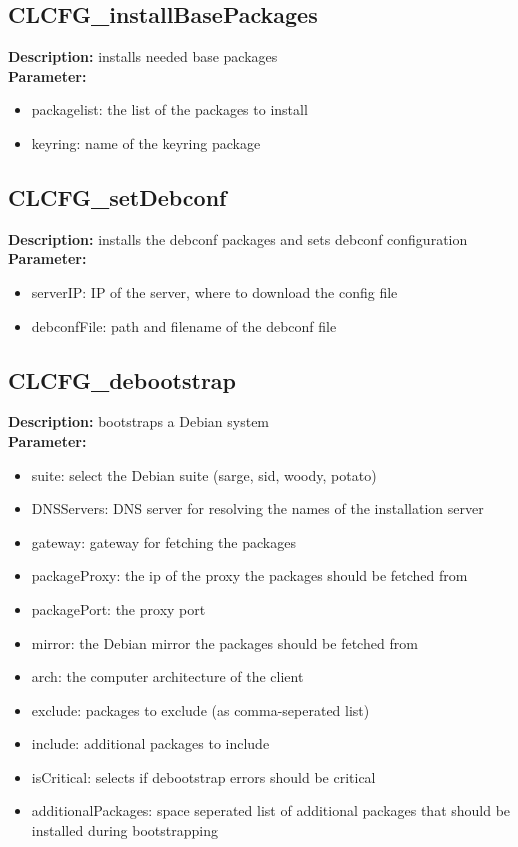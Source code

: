\subsection{CLCFG\_installBasePackages}
\textbf{Description:} installs needed base packages\\
\textbf{Parameter:}
\begin{itemize}
\item packagelist: the list of the packages to install
\item keyring: name of the keyring package
\end{itemize}

\subsection{CLCFG\_setDebconf}
\textbf{Description:} installs the debconf packages and sets debconf configuration\\
\textbf{Parameter:}
\begin{itemize}
\item serverIP: IP of the server, where to download the config file
\item debconfFile: path and filename of the debconf file
\end{itemize}

\subsection{CLCFG\_debootstrap}
\textbf{Description:} bootstraps a Debian system\\
\textbf{Parameter:}
\begin{itemize}
\item suite: select the Debian suite (sarge, sid, woody, potato)
\item DNSServers: DNS server for resolving the names of the installation server
\item gateway: gateway for fetching the packages
\item packageProxy: the ip of the proxy the packages should be fetched from
\item packagePort: the proxy port
\item mirror: the Debian mirror the packages should be fetched from
\item arch: the computer architecture of the client
\item exclude: packages to exclude (as comma-seperated list)
\item include: additional packages to include
\item isCritical: selects if debootstrap errors should be critical
\item additionalPackages: space seperated list of additional packages that should be installed during bootstrapping
\end{itemize}

